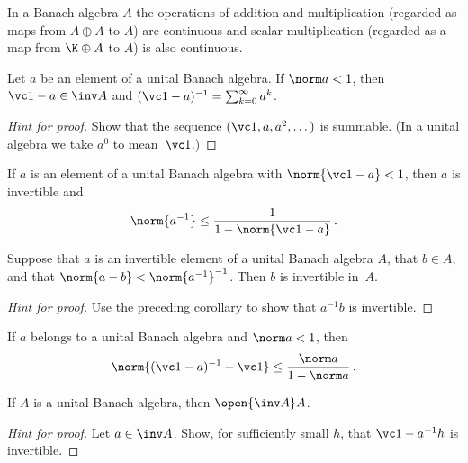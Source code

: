 \begin{prop} In a Banach algebra $A$ the operations of addition and multiplication (regarded as
maps from $A \oplus A$ to $A$) are continuous and scalar multiplication (regarded as a map from
$\K \oplus A$ to $A$) is also continuous.
\end{prop}

\begin{prop}\label{prop_Neumann_series} Let $a$ be an element of a unital Banach algebra.
If $\norm a < 1$, then
$\vc 1 - a \in \inv A$ and $(\vc 1 - a)^{-1} = \sum_{k=0}^\infty a^k$.
\end{prop}

\begin{proof}[\emph{Hint for proof}]  Show that the sequence $(\vc 1, a, a^2, \dots)$ is
summable.  (In a unital algebra we take $a^0$ to mean~$\vc 1$.)  \ns
\end{proof}

\begin{cor}\label{cor_Neumann_series} If $a$ is an element of a unital Banach algebra with $\norm{\vc 1 - a} < 1$, then $a$ is invertible and
    \[ \norm{a^{-1}} \le \frac{1}{1 - \norm{\vc 1 - a}}\,.  \]
\end{cor}

\begin{cor}\label{cor2_Neumann_series} Suppose that $a$ is an invertible element of a unital Banach algebra $A$, that $b \in A$,
and that $\norm{a - b} < \norm{a^{-1}}^{-1}$.  Then $b$ is invertible in~$A$.
\end{cor}

\begin{proof}[\emph{Hint for proof}] Use the preceding corollary to show that $a^{-1}b$ is invertible.
\ns \end{proof}

\begin{cor} If $a$ belongs to a unital Banach algebra and $\norm a < 1$, then
   \[ \norm{(\vc 1 - a)^{-1} - \vc 1} \le \frac{\norm a}{1 - \norm a}\,. \]
\end{cor}

\begin{prop}\label{000644fa} If $A$ is a unital Banach algebra, then $\open{\inv A}A$.
\end{prop}

\begin{proof}[\emph{Hint for proof}] Let $a \in \inv A$.  Show, for sufficiently small $h$,
that $\vc 1 - a^{-1}h$ is invertible.  \ns
\end{proof}

